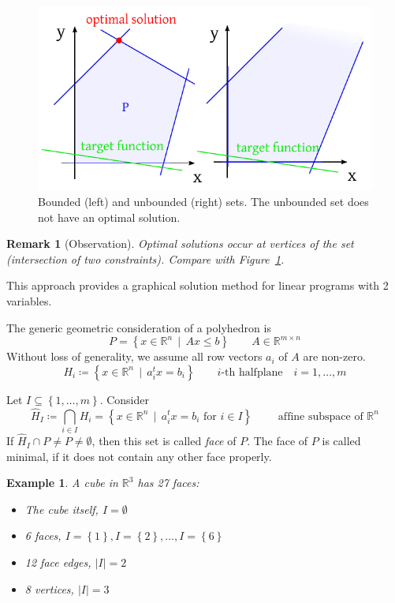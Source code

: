 \documentclass[a4paper]{article}
\numberwithin{lecref}{section}
\newtheorem*{Example}{Example}
\newtheorem*{Remark}{Remark}
\newcommand{\Abs}[1]{\left|#1\right|}
\newcommand{\Set}[1]{\left\{#1\right\}}
\newcommand{\SetDef}[2]{\left\{#1\,\mid\,#2\right\}}
\begin{document}
\begin{figure}[t]
	\begin{center}
		\includegraphics{img/01-bounded-set.pdf}
		\caption{Bounded (left) and unbounded (right) sets. The unbounded set does not have an optimal solution.}
		\label{img:boundedness}
	\end{center}
\end{figure}

\begin{Remark}[Observation]
  Optimal solutions occur at vertices of the set (intersection of two constraints). Compare with Figure~\ref{img:boundedness}.
\end{Remark}

This approach provides a graphical solution method for linear programs with 2 variables.

The generic geometric consideration of a polyhedron is
\[ P = \SetDef{x \in \mathbb R^n}{Ax \leq b} \qquad A \in \mathbb R^{m \times n} \]
Without loss of generality, we assume all row vectors $a_i$ of $A$ are non-zero.
\[ H_i \coloneqq \SetDef{x \in \mathbb R^n}{a_i^t x = b_i} \qquad \text{$i$-th halfplane} \quad i = 1, \dots, m \]

Let $I \subseteq \Set{1, \dots, m}$. Consider
\[ \hat H_I \coloneqq \bigcap_{i \in I} H_i = \SetDef{x \in \mathbb R^n}{a_i^t x = b_i \text{ for } i \in I} \qquad \text{ affine subspace of } \mathbb R^n \]
If $\hat H_I \cap P \neq P \neq \emptyset$, then this set is called \emph{face} of $P$.
The face of $P$ is called minimal, if it does not contain any other face properly.

\begin{Example}
	A cube in $\mathbb R^3$ has 27 faces:
	\begin{itemize}
		\item The cube itself, $I = \emptyset$
		\item 6 faces, $I = \Set{1}, I = \Set{2}, \dots, I = \Set{6}$
		\item 12 face edges, $\Abs{I} = 2$
		\item 8 vertices, $\Abs{I} = 3$
	\end{itemize}
\end{Example}
\end{document}
